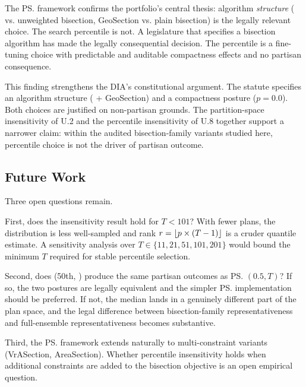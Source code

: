 The \ps{} framework confirms the portfolio's central thesis: algorithm
\emph{structure} (\ar{} vs. unweighted bisection, GeoSection vs. plain
bisection) is the legally relevant choice.
The search percentile is not.
A legislature that specifies a bisection algorithm has made the legally
consequential decision.
The percentile is a fine-tuning choice with predictable and auditable
compactness effects and no partisan consequence.

This finding strengthens the DIA's constitutional argument.
The statute specifies an algorithm structure (\ar{} + GeoSection) and a
compactness posture ($p = 0.0$).
Both choices are justified on non-partisan grounds.
The partition-space insensitivity of U.2 and the percentile insensitivity
of U.8 together support a narrower claim: within the audited bisection-family
variants studied here, percentile choice is not the driver of partisan outcome.

\subsection{Future Work}

Three open questions remain.

First, does the insensitivity result hold for $T < 101$?
With fewer plans, the distribution is less well-sampled and rank $r =
\lfloor p \times (T-1) \rfloor$ is a cruder quantile estimate.
A sensitivity analysis over $T \in \{11, 21, 51, 101, 201\}$ would
bound the minimum $T$ required for stable percentile selection.

Second, does \ts{}(50th, \recom{}) produce the same partisan outcomes as
\ps{}$(0.5, T)$?
If so, the two postures are legally equivalent and the simpler \ps{}
implementation should be preferred.
If not, the \recom{} median lands in a genuinely different part of the plan
space, and the legal difference between bisection-family representativeness
and full-ensemble representativeness becomes substantive.

Third, the \ps{} framework extends naturally to multi-constraint variants
(VrASection, AreaSection).
Whether percentile insensitivity holds when additional constraints are added
to the bisection objective is an open empirical question.
